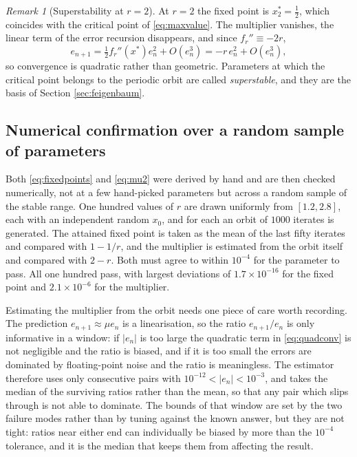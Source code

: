 \documentclass[11pt,a4paper]{article}
\theoremstyle{definition}
\theoremstyle{remark}
\newtheorem{remark}[proposition]{Remark}
\newcommand{\logmap}{f_r}
\begin{document}
\begin{remark}[Superstability at $r=2$]
\label{rem:superstable}
At $r=2$ the fixed point is $x_2^{*}=\tfrac12$, which coincides with the
critical point of \eqref{eq:maxvalue}. The multiplier vanishes, the linear
term of the error recursion disappears, and since $\logmap''\equiv-2r$,
\begin{equation}
  e_{n+1} = \tfrac12\logmap''(x^{*})e_n^2 + O(e_n^3) = -r\,e_n^2 + O(e_n^3) ,
  \label{eq:quadconv}
\end{equation}
so convergence is quadratic rather than geometric. Parameters at which the
critical point belongs to the periodic orbit are called \emph{superstable},
and they are the basis of Section \ref{sec:feigenbaum}.
\end{remark}

\subsection{Numerical confirmation over a random sample of parameters}
\label{sec:randomtest}

Both \eqref{eq:fixedpoints} and \eqref{eq:mu2} were derived by hand and are
then checked numerically, not at a few hand-picked parameters but across a
random sample of the stable range. One hundred values of $r$ are drawn
uniformly from $[1.2, 2.8]$, each with an independent random $x_0$, and for
each an orbit of $1000$ iterates is generated. The attained fixed point is
taken as the mean of the last fifty iterates and compared with $1-1/r$, and
the multiplier is estimated from the orbit itself and compared with $2-r$.
Both must agree to within $10^{-4}$ for the parameter to pass. All one hundred
pass, with largest deviations of $1.7\times10^{-16}$ for the fixed point and
$2.1\times10^{-6}$ for the multiplier.

Estimating the multiplier from the orbit needs one piece of care worth
recording. The prediction $e_{n+1}\approx\mu e_n$ is a linearisation, so the
ratio $e_{n+1}/e_n$ is only informative in a window: if $|e_n|$ is too large
the quadratic term in \eqref{eq:quadconv} is not negligible and the ratio is
biased, and if it is too small the errors are dominated by floating-point
noise and the ratio is meaningless. The estimator therefore uses only
consecutive pairs with $10^{-12} < |e_n| < 10^{-3}$, and takes the median of
the surviving ratios rather than the mean, so that any pair which slips
through is not able to dominate. The bounds of that window are set by the two
failure modes rather than by tuning against the known answer, but they are
not tight: ratios near either end can individually be biased by more than the
$10^{-4}$ tolerance, and it is the median that keeps them from affecting the
result.
\end{document}
